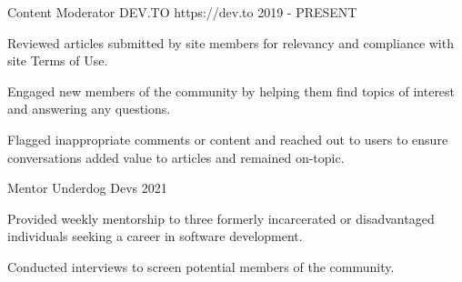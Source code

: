 

\begin {cventries}
  \cventry
    {Content Moderator} %
    {DEV.TO} %
    {https://dev.to} %
    {2019 - PRESENT} %
    {
      \begin{cvitems} %
        \item {Reviewed articles submitted by site members for relevancy and compliance with site Terms of Use.}
        \item {Engaged new members of the community by helping them find topics of interest and answering any questions.}
        \item {Flagged inappropriate comments or content and reached out to users to ensure conversations added value to articles and remained on-topic.}
      \end{cvitems}
    }
  \cventry
    {Mentor} %
    {Underdog Devs} %
    {} %
    {2021} %
    {
      \begin{cvitems} %
        \item {Provided weekly mentorship to three formerly incarcerated or disadvantaged individuals seeking a career in software development.}
        \item {Conducted interviews to screen potential members of the community.}
      \end{cvitems}
    }

\end{cventries}
